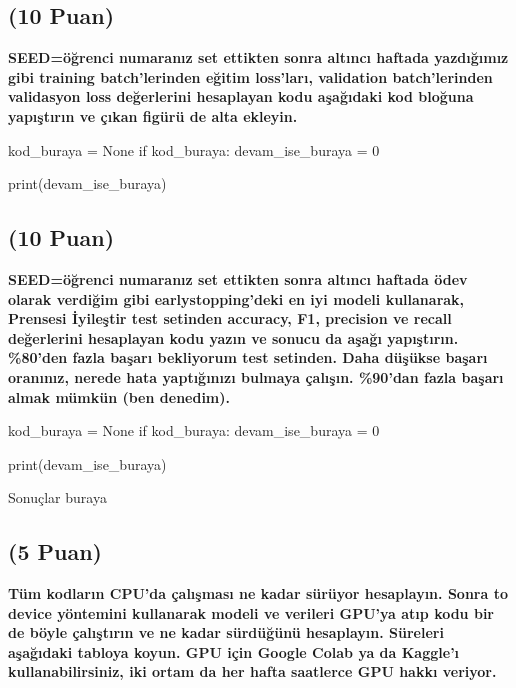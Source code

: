 \documentclass[11pt]{article}
\begin{document}
\subsection{(10 Puan)} \textbf{SEED=öğrenci numaranız set ettikten sonra altıncı haftada yazdığımız gibi training batch'lerinden eğitim loss'ları, validation batch'lerinden validasyon loss değerlerini hesaplayan kodu aşağıdaki kod bloğuna yapıştırın ve çıkan figürü de alta ekleyin.}

\begin{python}
kod_buraya = None
if kod_buraya:
    devam_ise_buraya = 0

print(devam_ise_buraya)
\end{python}

\begin{comment}
\begin{figure}[ht!]
    \centering
    \texttt{[image: mypicturehere.png]}
    \caption{Buraya açıklama yazın}
    \label{fig:my_pic}
\end{figure}
\end{comment}

\subsection{(10 Puan)} \textbf{SEED=öğrenci numaranız set ettikten sonra altıncı haftada ödev olarak verdiğim gibi earlystopping'deki en iyi modeli kullanarak, Prensesi İyileştir test setinden accuracy, F1, precision ve recall değerlerini hesaplayan kodu yazın ve sonucu da aşağı yapıştırın. \%80'den fazla başarı bekliyorum test setinden. Daha düşükse başarı oranınız, nerede hata yaptığınızı bulmaya çalışın. \%90'dan fazla başarı almak mümkün (ben denedim).}

\begin{python}
kod_buraya = None
if kod_buraya:
    devam_ise_buraya = 0

print(devam_ise_buraya)
\end{python}

Sonuçlar buraya

\subsection{(5 Puan)} \textbf{Tüm kodların CPU'da çalışması ne kadar sürüyor hesaplayın. Sonra to device yöntemini kullanarak modeli ve verileri GPU'ya atıp kodu bir de böyle çalıştırın ve ne kadar sürdüğünü hesaplayın. Süreleri aşağıdaki tabloya koyun. GPU için Google Colab ya da Kaggle'ı kullanabilirsiniz, iki ortam da her hafta saatlerce GPU hakkı veriyor.}
\end{document}
